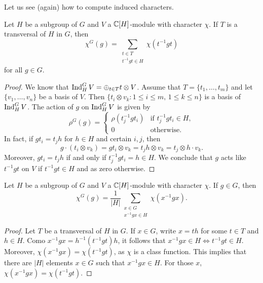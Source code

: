 Let us see (again) how to compute 
induced characters. 

\begin{proposition}
Let $H$ be a subgroup of $G$ and $V$ a $\mathbb{C}[H]$-module with character $\chi$. If  
$T$ is a transversal of $H$ in $G$, then  
\[
\chi^G(g)=\sum_{\substack{t\in T\\t^{-1}gt\in H}}\chi(t^{-1}gt)
\]
for all $g\in G$. 
\end{proposition}

\begin{proof}
    We know that $\operatorname{Ind}_H^GV=\oplus_{t\in T}t\otimes V$. 
    Assume that $T=\{t_1,\dots,t_m\}$ 
    and let $\{v_1,\dots,v_n\}$ be a basis of $V$. 
    Then $\{t_i\otimes v_k:1\leq i\leq m,\,1\leq k\leq n\}$ is a basis of $\operatorname{Ind}_H^GV$. The action of 
    $g$ on $\operatorname{Ind}_H^GV$ is given by 
    \[
    \rho^G(g)=\begin{cases}
    \rho(t_j^{-1}gt_i) & \text{if $t_j^{-1}gt_i\in H$},\\
    0 & \text{otherwise}.
    \end{cases}
    \]
    In fact, if $gt_i=t_jh$ for $h\in H$ and certain $i,j$, then  
    \[
    g\cdot (t_i\otimes v_k)=gt_i\otimes v_k=t_jh\otimes v_k=t_j\otimes h\cdot v_k. 
    \]
    Moreover, $gt_i=t_jh$ if and only if $t_j^{-1}gt_i=h\in H$. We conclude that 
    $g$ acts like $t^{-1}gt$ on $V$ if $t^{-1}gt\in H$ and as zero otherwise.  
\end{proof}

\begin{corollary}
\label{cor:induccion}
    Let $H$ be a subgroup of $G$ 
    and $V$ a $\mathbb{C}[H]$-module with character $\chi$.
    If $g\in G$, then 
    \[
    \chi^G(g)=\frac{1}{|H|}\sum_{\substack{x\in G\\x^{-1}gx\in H}}\chi(x^{-1}gx).
    \]
\end{corollary}

\begin{proof}
    Let $T$ be a transversal of $H$ in $G$. If $x\in G$, write $x=th$ for some $t\in T$ and $h\in H$. 
    Como $x^{-1}gx=h^{-1}(t^{-1}gt)h$, it follows that $x^{-1}gx\in H\Longleftrightarrow t^{-1}gt\in H$. Moreover,   
    $\chi(x^{-1}gx)=\chi(t^{-1}gt)$, as $\chi$ is a class function. This implies that there are $|H|$ elements $x\in G$ 
    such that $x^{-1}gx\in H$. For those $x$, $\chi(x^{-1}gx)=\chi(t^{-1}gt)$. 
\end{proof}